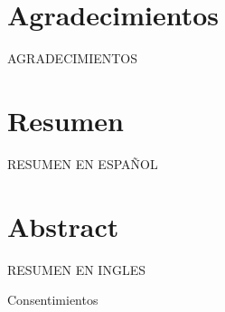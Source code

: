 \documentclass[reqno,twoside, 12pt]{report}
\begin{document}
	
	\vspace*{20pt}
	\begingroup
	\centering
		\section*{Agradecimientos}
				\endgroup
		
		AGRADECIMIENTOS

		\vspace*{20pt}
			
		\newpage
		
		\vspace*{20pt}
		\begingroup
		\centering
		\section*{Resumen}
		\endgroup
		
		
		RESUMEN EN ESPAÑOL
		
			
		\newpage
		
		\vspace*{20pt}
		\begingroup
		\centering
		\section*{Abstract}
		\endgroup
		
		
		RESUMEN EN INGLES
		
			
				\newpage
		
		\vspace*{20pt}
		
		Consentimientos
		\begin{comment}
		Yo, \textbf{Nuria Rodríguez Barroso}, alumno de la titulación Grado en Ingeniería Informática de la \textbf{Escuela Técnica Superior de Ingenierías Informática y de Telecomunicación de la Universidad de Granada}, con DNI 54120359W certifico la autoría de este Trabajo de Fin de Grado y autorizo la ubicación de la siguiente copia en la biblioteca del centro para su consulta.

		\vspace{5cm}
		Fdo.: Miguel López Campos
		\vspace{2cm}
	
		
		\hspace{6cm}
		Granada a 8 de septiembre de 2017
		\end{comment}
\end{document}
